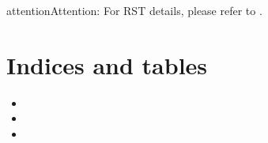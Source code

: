 \documentclass[letterpaper,10pt,english]{sphinxmanual}
\begin{document}
\begin{sphinxadmonition}{attention}{Attention:}
\sphinxAtStartPar
For RST details, please refer to .
\end{sphinxadmonition}


\chapter{Indices and tables}
\label{\detokenize{index:indices-and-tables}}\begin{itemize}
\item {} 
\sphinxAtStartPar
{}

\item {} 
\sphinxAtStartPar
{}

\item {} 
\sphinxAtStartPar
{}

\end{itemize}
\end{document}
